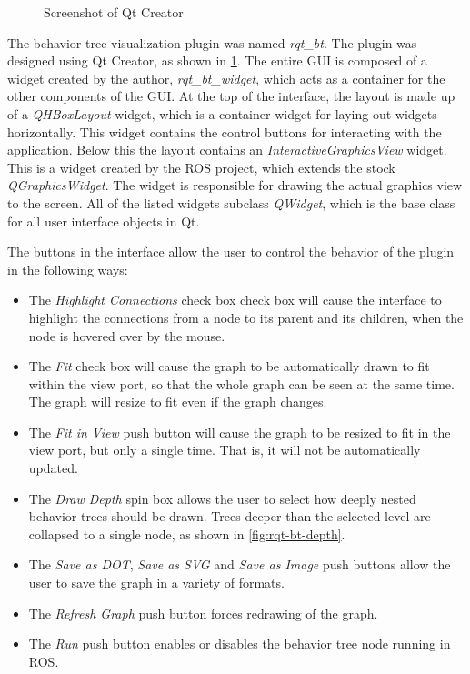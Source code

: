 \documentclass[\rootfolder/main.tex]{subfiles}
\begin{document}
\begin{figure}[ht]
    \caption{Screenshot of Qt Creator}
    \label{fig:qt-creator}
\end{figure}

The behavior tree visualization plugin was named \emph{rqt\_bt}.
The plugin was designed using Qt Creator, as shown in \cref{fig:qt-creator}.
The entire GUI is composed of a widget created by the author, \emph{rqt\_bt\_widget}, which acts as a container for the other components of the GUI.
At the top of the interface, the layout is made up of a \emph{QHBoxLayout} widget, which is a container widget for laying out widgets horizontally.
This widget contains the control buttons for interacting with the application.
Below this the layout contains an \emph{InteractiveGraphicsView} widget.
This is a widget created by the ROS project, which extends the stock \emph{QGraphicsWidget}.
The widget is responsible for drawing the actual graphics view to the screen.
All of the listed widgets subclass \emph{QWidget}, which is the base class for all user interface objects in Qt.

The buttons in the interface allow the user to control the behavior of the plugin in the following ways:

\begin{itemize}
\item The \emph{Highlight Connections} check box check box will cause the interface to highlight the connections from a node to its parent and its children, when the node is hovered over by the mouse.
\item The \emph{Fit} check box will cause the graph to be automatically drawn to fit within the view port, so that the whole graph can be seen at the same time. The graph will resize to fit even if the graph changes.
\item The \emph{Fit in View} push button will cause the graph to be resized to fit in the view port, but only a single time. That is, it will not be automatically updated.
\item The \emph{Draw Depth} spin box allows the user to select how deeply nested behavior trees should be drawn. Trees deeper than the selected level are collapsed to a single node, as shown in \cref{fig:rqt-bt-depth}.
\item The \emph{Save as DOT}, \emph{Save as SVG} and \emph{Save as Image} push buttons allow the user to save the graph in a variety of formats.
\item The \emph{Refresh Graph} push button forces redrawing of the graph.
\item The \emph{Run} push button enables or disables the behavior tree node running in ROS.
\end{itemize}
\end{document}
